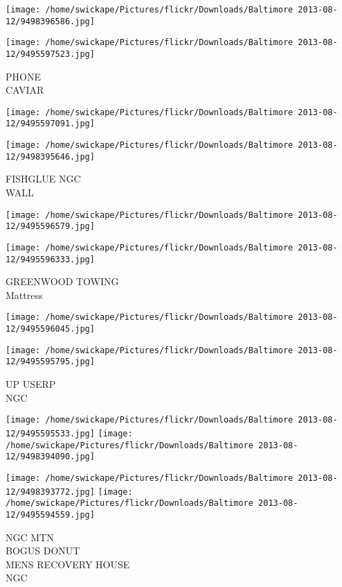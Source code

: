 \documentclass[10pt,letterpaper]{article}
\begin{document}
\texttt{[image: /home/swickape/Pictures/flickr/Downloads/Baltimore 2013-08-12/9498396586.jpg]}

\vspace{0.25in}
\texttt{[image: /home/swickape/Pictures/flickr/Downloads/Baltimore 2013-08-12/9495597523.jpg]}

PHONE\\
CAVIAR
\pagebreak

\texttt{[image: /home/swickape/Pictures/flickr/Downloads/Baltimore 2013-08-12/9495597091.jpg]}

\vspace{0.25in}
\texttt{[image: /home/swickape/Pictures/flickr/Downloads/Baltimore 2013-08-12/9498395646.jpg]}

FISHGLUE NGC\\
WALL
\pagebreak

\texttt{[image: /home/swickape/Pictures/flickr/Downloads/Baltimore 2013-08-12/9495596579.jpg]}

\vspace{0.25in}
\texttt{[image: /home/swickape/Pictures/flickr/Downloads/Baltimore 2013-08-12/9495596333.jpg]}

GREENWOOD TOWING\\
Mattress
\pagebreak

\texttt{[image: /home/swickape/Pictures/flickr/Downloads/Baltimore 2013-08-12/9495596045.jpg]}

\vspace{0.25in}
\texttt{[image: /home/swickape/Pictures/flickr/Downloads/Baltimore 2013-08-12/9495595795.jpg]}

UP USERP\\
NGC
\pagebreak

\texttt{[image: /home/swickape/Pictures/flickr/Downloads/Baltimore 2013-08-12/9495595533.jpg]}
\texttt{[image: /home/swickape/Pictures/flickr/Downloads/Baltimore 2013-08-12/9498394090.jpg]}

\texttt{[image: /home/swickape/Pictures/flickr/Downloads/Baltimore 2013-08-12/9498393772.jpg]}
\texttt{[image: /home/swickape/Pictures/flickr/Downloads/Baltimore 2013-08-12/9495594559.jpg]}

NGC MTN\\
BOGUS DONUT\\
MENS RECOVERY HOUSE\\
NGC
\pagebreak
\end{document}
